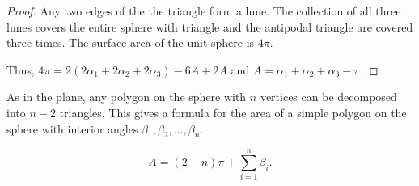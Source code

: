 \begin{proof}
Any two edges of the the triangle form a lune. The collection of 
all three lunes covers the entire sphere with triangle and the antipodal triangle
are covered three times. The surface area of the unit sphere is $4\pi$.

Thus, $4\pi=2(2\alpha_1+2\alpha_2+2\alpha_3)-6A+2A$
and $A=\alpha_1+\alpha_2+\alpha_3-\pi$.
\end{proof}

As in the plane, any polygon on the sphere with $n$ vertices can be decomposed
into $n-2$ triangles. This gives a formula for the area of a simple polygon
on the sphere with interior angles $\beta_1,\beta_2,\ldots, \beta_n$.

\begin{equation} \label{eqn:sphere-area}
A=(2-n)\pi +\sum_{i=1}^n \beta_i.
\end{equation}





